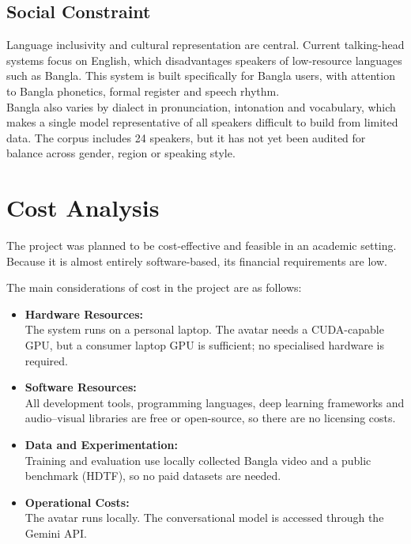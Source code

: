 \subsection{Social Constraint}

Language inclusivity and cultural representation are central. Current talking-head systems focus on English, which disadvantages speakers of low-resource languages such as Bangla. This system is built specifically for Bangla users, with attention to Bangla phonetics, formal register and speech rhythm.\\

\noindent
Bangla also varies by dialect in pronunciation, intonation and vocabulary, which makes a single model representative of all speakers difficult to build from limited data. The corpus includes 24 speakers, but it has not yet been audited for balance across gender, region or speaking style.


\section{Cost Analysis}
The project was planned to be cost-effective and feasible in an academic setting. Because it is almost entirely software-based, its financial requirements are low.

The main considerations of cost in the project are as follows:

\begin{itemize}
    \item \textbf{Hardware Resources:}\\
    The system runs on a personal laptop. The avatar needs a CUDA-capable GPU, but a consumer laptop GPU is sufficient; no specialised hardware is required.

    \item \textbf{Software Resources:}\\
    All development tools, programming languages, deep learning frameworks and audio--visual libraries are free or open-source, so there are no licensing costs.

    \item \textbf{Data and Experimentation:}\\
    Training and evaluation use locally collected Bangla video and a public benchmark (HDTF), so no paid datasets are needed.

    \item \textbf{Operational Costs:}\\
    The avatar runs locally. The conversational model is accessed through the Gemini API.
\end{itemize}

